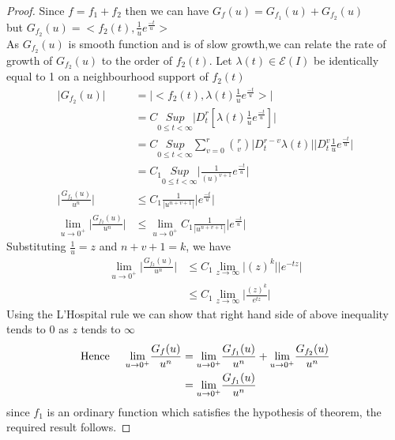 \begin{proof}
Since $ f=f_{1}+f_{2} $ then we can have
$G_{f}(u)=G_{f_{1}}(u)+G_{f_{2}}(u)$\\
but $G_{f_{2}}(u) = <f_{2}(t),\frac{1}{u}e^{\frac{-t}{u}}>$\\
As $G_{f_{2}}(u)$ is smooth function and is of slow growth,we can relate the rate of growth of $G_{f_{2}}(u)$ to the order of $f_{2}(t)$. Let $\lambda(t)\in\mathcal{E}(I)$ be identically equal to 1 on a neighbourhood support of $ f_{2}(t) $
\begin{align*}
\vert G_{f_{2}}(u)\vert &= \vert< f_{2}(t),\lambda(t)\frac{1}{u}e^{\frac{-t}{u}}>\vert\\
&=C\underset{0\leq t<\infty}{Sup}\vert D_{t}^{r}[\lambda(t)\frac{1}{u}e^{\frac{-t}{u}}]\vert\\
&=C\underset{0\leq t<\infty}{Sup}\sum_{v=0}^{r}\binom{r}{v}\vert D_{t}^{r-v}\lambda(t)\vert \vert D_{t}^{v}\frac{1}{u}e^{\frac{-t}{u}}\vert\\
&=C_{1} \underset{0\leq t<\infty}{Sup}\vert \frac{1}{(u)^{v+1}}e^{\frac{-t}{u}}\vert\\
 \vert\frac{G_{f_{2}}(u)}{u^{n}} \vert & \leq C_{1}\frac{1}{\vert u^{n+v+1}\vert}\vert e^{\frac{-t}{u}}\vert\\
\underset{u\rightarrow 0^{+}}\lim \vert\frac{G_{f_{2}}(u)}{u^{n}} \vert &\leq \underset{u\rightarrow 0^{+}}\lim C_{1}\frac{1}{\vert u^{n+v+1}\vert}\vert e^{\frac{-t}{u}}\vert
\end{align*}
Substituting $ \frac{1}{u} = z $ and $ n+v+1=k $, we have
\begin{align*}
\underset{u\rightarrow 0^{+}}\lim \vert\frac{G_{f_{2}}(u)}{u^{n}} \vert &\leq C_{1}\underset{z\rightarrow \infty}\lim\vert(z)^{k}\vert \vert e^{-tz}\vert\\
&\leq C_{1}\underset{z\rightarrow \infty}\lim \vert\frac{(z)^{k}}{e^{tz}}\vert
\end{align*}
Using the L'Hospital rule we can show that right hand side of above inequality tends to $0$ as $z$ tends to $\infty$
\begin{align*}
\text{Hence}\hspace{0.5cm} \underset{u\rightarrow 0^{+}}\lim \frac{G_{f}(u) }{u^{n}}& =\underset{u\rightarrow 0^{+}}\lim \frac{G_{f_{1}}(u)}{u^{n}}+ \underset{u\rightarrow 0^{+}}\lim \frac{G_{f_{2}}(u) }{u^{n}}\\
&=\underset{u\rightarrow 0^{+}}\lim \frac{G_{f_{1}}(u)}{u^{n}}
\end{align*}
since $f_{1}$ is an ordinary function which satisfies the hypothesis of theorem, the required result follows.
\end{proof} 
